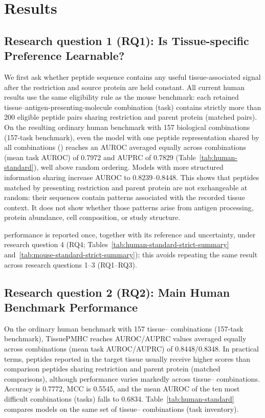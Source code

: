\section{Results}

\subsection{Research question 1 (RQ1): Is Tissue-specific Preference Learnable?}

We first ask whether peptide sequence contains any useful tissue-associated signal after the \plainMHC{} restriction and source protein are held constant. All current human results use the same eligibility rule as the mouse benchmark: each retained tissue--antigen-presenting-molecule combination (task) contains strictly more than 200 eligible peptide pairs sharing restriction and parent protein (matched pairs). On the resulting ordinary human benchmark with 157 biological combinations (157-task benchmark), even the model with one peptide representation shared by all combinations (\plainSharedHeads{}) reaches an AUROC averaged equally across combinations (mean task AUROC) of 0.7972 and AUPRC of 0.7829 (Table~\ref{tab:human-standard}), well above random ordering. Models with more structured information sharing increase AUROC to 0.8239--0.8448. This shows that peptides matched by presenting restriction and parent protein are not exchangeable at random: their sequences contain patterns associated with the recorded tissue context. It does not show whether those patterns arise from antigen processing, protein abundance, cell composition, or study structure.

\plainPeptideOOF{} performance is reported once, together with its \plainMatchedOOF{} reference and uncertainty, under research question 4 (RQ4; Tables~\ref{tab:human-standard-strict-summary} and~\ref{tab:mouse-standard-strict-summary}); this avoids repeating the same result across research questions 1--3 (RQ1--RQ3).

\subsection{Research question 2 (RQ2): Main Human Benchmark Performance}

On the ordinary human benchmark with 157 tissue--\plainHLA{} combinations (157-task benchmark), TissuePMHC reaches AUROC/AUPRC values averaged equally across combinations (mean task AUROC/AUPRC) of 0.8448/0.8348. In practical terms, peptides reported in the target tissue usually receive higher scores than comparison peptides sharing restriction and parent protein (matched comparisons), although performance varies markedly across tissue--\plainHLA{} combinations. Accuracy is 0.7772, MCC is 0.5545, and the mean AUROC of the ten most difficult combinations (tasks) falls to 0.6834. Table~\ref{tab:human-standard} compares models on the same set of tissue--\plainHLA{} combinations (task inventory).

